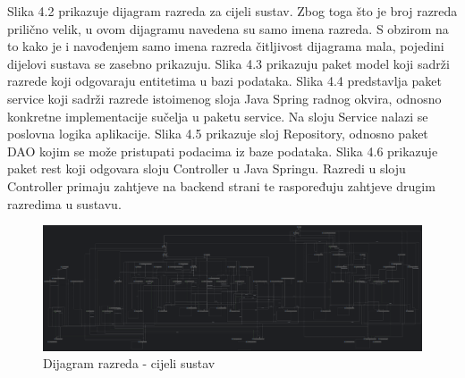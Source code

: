 			Slika 4.2 prikazuje dijagram razreda za cijeli sustav. Zbog toga što je broj razreda prilično velik, u ovom dijagramu navedena su samo imena razreda. S obzirom na to kako je i navođenjem samo imena razreda čitljivost dijagrama mala, pojedini dijelovi sustava se zasebno prikazuju. Slika 4.3 prikazuju paket model koji sadrži razrede koji odgovaraju entitetima u bazi podataka. Slika 4.4 predstavlja paket service koji sadrži razrede istoimenog sloja Java Spring radnog okvira, odnosno konkretne implementacije sučelja u paketu service. Na sloju Service nalazi se poslovna logika aplikacije. Slika 4.5 prikazuje sloj Repository, odnosno paket DAO kojim se može pristupati podacima iz baze podataka. Slika 4.6 prikazuje paket rest koji odgovara sloju Controller u Java Springu. Razredi u sloju Controller primaju zahtjeve na backend strani te raspoređuju zahtjeve drugim razredima u sustavu.
			
			\begin{figure}[H]
				\includegraphics[width=\textwidth]{slike/ClassDiagram0.PNG}
				\caption{Dijagram razreda - cijeli sustav}
				\label{fig:classDiagram0}
			\end{figure}
			
